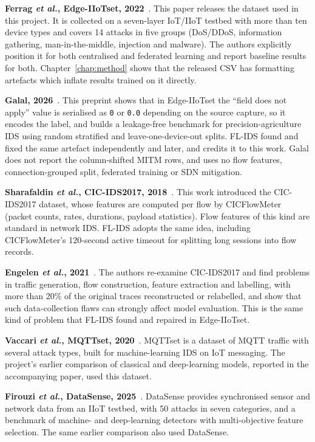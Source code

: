 \textbf{Ferrag \emph{et al.}, Edge-IIoTset, 2022}~\cite{ferrag2022edge}. This paper releases the dataset used in this project. It is collected on a seven-layer IoT/IIoT testbed with more than ten device types and covers 14 attacks in five groups (DoS/DDoS, information gathering, man-in-the-middle, injection and malware). The authors explicitly position it for both centralised and federated learning and report baseline results for both. Chapter~\ref{chap:method} shows that the released CSV has formatting artefacts which inflate results trained on it directly.

\textbf{Galal, 2026}~\cite{galal2026provenance}. This preprint shows that in Edge-IIoTset the ``field does not apply'' value is serialised as \texttt{0} or \texttt{0.0} depending on the source capture, so it encodes the label, and builds a leakage-free benchmark for precision-agriculture IDS using random stratified and leave-one-device-out splits. FL-IDS found and fixed the same artefact independently and later, and credits it to this work. Galal does not report the column-shifted MITM rows, and uses no flow features, connection-grouped split, federated training or SDN mitigation.

\textbf{Sharafaldin \emph{et al.}, CIC-IDS2017, 2018}~\cite{sharafaldin2018cicids}. This work introduced the CIC-IDS2017 dataset, whose features are computed per flow by CICFlowMeter (packet counts, rates, durations, payload statistics). Flow features of this kind are standard in network IDS. FL-IDS adopts the same idea, including CICFlowMeter's 120-second active timeout for splitting long sessions into flow records.

\textbf{Engelen \emph{et al.}, 2021}~\cite{engelen2021}. The authors re-examine CIC-IDS2017 and find problems in traffic generation, flow construction, feature extraction and labelling, with more than 20\% of the original traces reconstructed or relabelled, and show that such data-collection flaws can strongly affect model evaluation. This is the same kind of problem that FL-IDS found and repaired in Edge-IIoTset.

\textbf{Vaccari \emph{et al.}, MQTTset, 2020}~\cite{vaccari2020}. MQTTset is a dataset of MQTT traffic with several attack types, built for machine-learning IDS on IoT messaging. The project's earlier comparison of classical and deep-learning models, reported in the accompanying paper, used this dataset.

\textbf{Firouzi \emph{et al.}, DataSense, 2025}~\cite{firouzi2025}. DataSense provides synchronised sensor and network data from an IIoT testbed, with 50 attacks in seven categories, and a benchmark of machine- and deep-learning detectors with multi-objective feature selection. The same earlier comparison also used DataSense.

